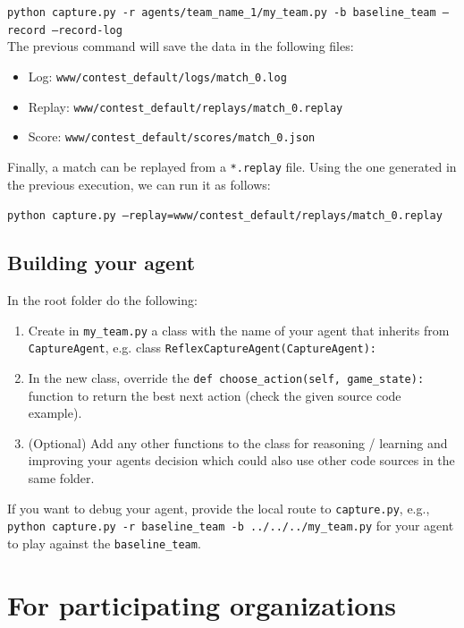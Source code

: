 \documentclass[11pt]{article}
\begin{document}
\texttt{python capture.py -r agents/team\_name\_1/my\_team.py -b baseline\_team --record --record-log}
\\

The previous command will save the data in the following files:
\begin{itemize}
    \item Log: \texttt{www/contest\_default/logs/match\_0.log}
    \item Replay: \texttt{www/contest\_default/replays/match\_0.replay}
    \item Score: \texttt{www/contest\_default/scores/match\_0.json}
\end{itemize}

Finally, a match can be replayed from a \texttt{*.replay} file. Using the one generated in the previous execution, we can run it as follows:

\texttt{python capture.py --replay=www/contest\_default/replays/match\_0.replay}

\subsection{Building your agent}
In the root folder do the following:

\begin{enumerate}
    \item Create in \texttt{my\_team.py} a class with the name of your agent that inherits from \texttt{CaptureAgent}, e.g. class \texttt{ReflexCaptureAgent(CaptureAgent):}
    \item In the new class, override the \texttt{def choose\_action(self, game\_state):} function to return the best next action (check the given source code example).
    \item (Optional) Add any other functions to the class for reasoning / learning and improving your agents decision which could also use other code sources in the same folder.
\end{enumerate}

If you want to debug your agent, provide the local route to \texttt{capture.py}, e.g., \texttt{python capture.py -r baseline\_team -b ../../../my\_team.py} for your agent to play against the \texttt{baseline\_team}.

\newpage
\section{For participating organizations}
\end{document}
